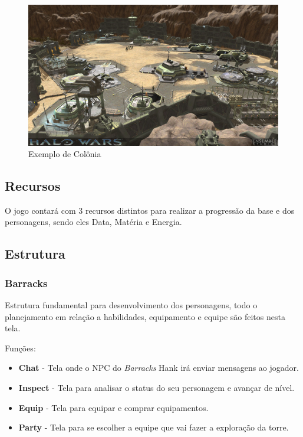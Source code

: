 \documentclass[11pt]{article} %
\begin{document}
\begin{figure}[!htp]
\centering
\includegraphics[scale=0.3]{res/base_building.png}
\caption{Exemplo de Colônia}
\label{Exemplo de Base Building}
\end{figure}

\subsection{Recursos}

O jogo contará com 3 recursos distintos para realizar a progressão da base e dos personagens, sendo eles Data, Matéria e Energia.

\subsection{Estrutura}

\subsubsection{Barracks}
Estrutura fundamental para desenvolvimento dos personagens, todo o planejamento em relação a habilidades, equipamento e equipe são feitos nesta tela.

Funções:
\begin{itemize}
  \item \textbf{Chat} - Tela onde o NPC do \textit{Barracks} Hank irá enviar mensagens ao jogador.
  \item \textbf{Inspect} - Tela para analisar o status do seu personagem e avançar de nível.
  \item \textbf{Equip} - Tela para equipar e comprar equipamentos.
  \item \textbf{Party} - Tela para se escolher a equipe que vai fazer a exploração da torre.
\end{itemize}
\end{document}
